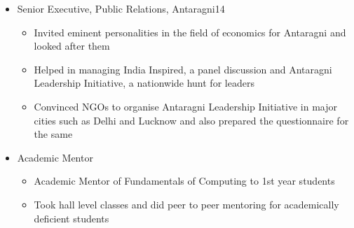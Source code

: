 \documentclass{article}
\begin{document}
\begin{itemize}
\item Senior Executive, Public Relations, Antaragni\textsc{}14\hspace*{\fill}
	\begin{itemize}
	\item Invited eminent personalities in the field of economics for Antaragni and looked after them
	\item Helped in managing India Inspired, a panel discussion and Antaragni Leadership Initiative, a nationwide hunt for leaders
	\item Convinced NGOs to organise Antaragni Leadership Initiative in major cities such as Delhi and Lucknow and also prepared the questionnaire for the same
	\end{itemize}
\item Academic Mentor\hspace*{\fill}
\begin{itemize}
\item Academic Mentor of Fundamentals of Computing to 1st year students
\item Took hall level classes and did peer to peer mentoring for academically deficient students
\end{itemize}
\end{itemize}
\end{document}

